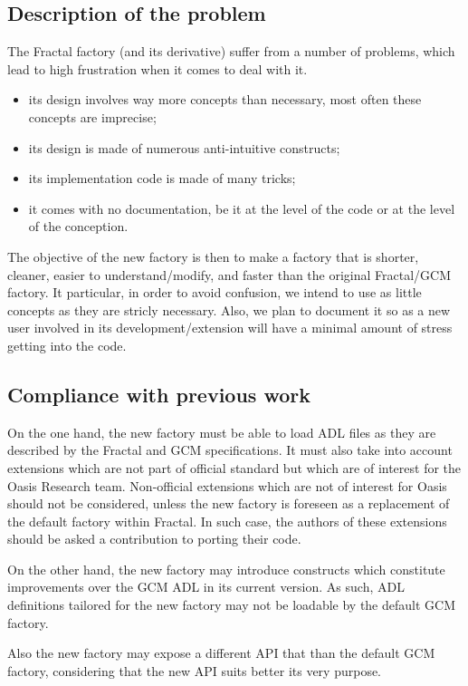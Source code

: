 \documentclass{article}
\begin{document}
\subsection{Description of the problem}
The Fractal factory (and its derivative) suffer from a number of problems, 
which lead to high frustration when it comes to deal with it.
\begin{itemize}
  \item its design involves way more concepts than necessary, most often these concepts are imprecise;
  \item its design is made of numerous anti-intuitive constructs;
  \item its implementation code is made of many tricks;
  \item it comes with no documentation, be it at the level of the code or at the level of the conception.
\end{itemize} 

The objective of the new factory is then to make a factory that is shorter, cleaner,
easier to understand/modify, and faster than the original Fractal/GCM factory. It particular, in order to avoid confusion,
we intend to use as little concepts as they are stricly necessary. Also, we plan to
document it so as a new user involved in its development/extension will have a minimal amount of stress getting into the code.


\subsection{Compliance with previous work}

On the one hand, the new factory must be able to load ADL files as they are described by the Fractal and GCM specifications.
It must also take into account extensions which are not part of official standard but which are of interest 
for the Oasis Research team. Non-official extensions which are not of interest for Oasis should not be
considered, unless the new factory is foreseen as a replacement of the default factory within Fractal.
In such case, the authors of these extensions should be asked a contribution to porting their code.

On the other hand, the new factory may introduce constructs which constitute improvements over the GCM ADL in its current version.
As such, ADL definitions tailored for the new factory may not be loadable by the default GCM factory.

Also  the new factory may expose a different API that than the default GCM factory, considering that the new API
suits better its very purpose.
\end{document}

